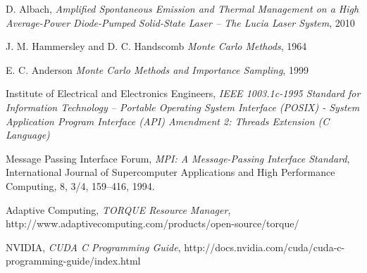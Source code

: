 \begin{thebibliography}{9}


    D. Albach,
    \emph{Amplified Spontaneous Emission and Thermal Management on a High Average-Power Diode-Pumped Solid-State Laser \--- The Lucia Laser System},
    2010

    J. M. Hammersley and D. C. Handscomb
    \emph{Monte Carlo Methods},
    1964

    E. C. Anderson
    \emph{Monte Carlo Methods and Importance Sampling},
    1999


    Institute of Electrical and Electronics Engineers,
    \emph{IEEE 1003.1c-1995 Standard for Information Technology \---
    Portable Operating System Interface (POSIX) \-- System Application Program Interface (API) Amendment 2: Threads Extension (C Language)}

    Message Passing Interface Forum,
    \emph{MPI: A Message-Passing Interface Standard}, 
    International Journal of Supercomputer Applications and High Performance Computing,
    8, 3/4, 159–416, 1994.

    Adaptive Computing,
    \emph{TORQUE Resource Manager},
    http://www.adaptivecomputing.com/products/open-source/torque/

    NVIDIA,
    \emph{CUDA C Programming Guide},
    http://docs.nvidia.com/cuda/cuda-c-programming-guide/index.html



\end{thebibliography}
